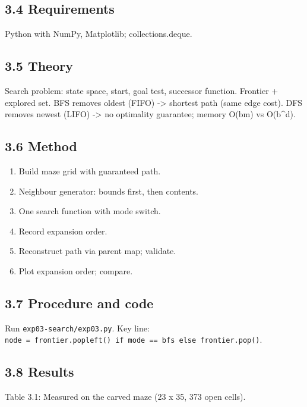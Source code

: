 \documentclass[
]{article}
\providecommand{\tightlist}{%
  \setlength{\itemsep}{0pt}\setlength{\parskip}{0pt}}
\begin{document}
\subsection{3.4 Requirements}\label{requirements-2}

Python with NumPy, Matplotlib; collections.deque.

\subsection{3.5 Theory}\label{theory-2}

Search problem: state space, start, goal test, successor function.
Frontier + explored set. BFS removes oldest (FIFO) -\textgreater{}
shortest path (same edge cost). DFS removes newest (LIFO)
-\textgreater{} no optimality guarantee; memory O(bm) vs O(b\^{}d).

\subsection{3.6 Method}\label{method-2}

\begin{enumerate}
\def\labelenumi{\arabic{enumi}.}
\tightlist
\item
  Build maze grid with guaranteed path.
\item
  Neighbour generator: bounds first, then contents.
\item
  One search function with mode switch.
\item
  Record expansion order.
\item
  Reconstruct path via parent map; validate.
\item
  Plot expansion order; compare.
\end{enumerate}

\subsection{3.7 Procedure and code}\label{procedure-and-code-2}

Run \texttt{exp03-search/exp03.py}. Key line:
\texttt{node\ =\ frontier.popleft()\ if\ mode\ ==\ \textquotesingle{}bfs\textquotesingle{}\ else\ frontier.pop()}.

\subsection{3.8 Results}\label{results-2}

Table 3.1: Measured on the carved maze (23 x 35, 373 open cells).
\end{document}
